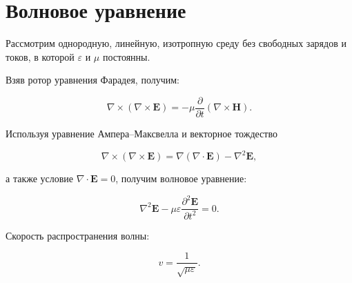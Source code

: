 \section{Волновое уравнение}
\label{sec:wave}

Рассмотрим однородную, линейную,
изотропную среду без свободных зарядов
и токов, в которой $\varepsilon$
и $\mu$ постоянны.

Взяв ротор уравнения Фарадея,
получим:

\begin{equation}
\nabla \times (\nabla \times \mathbf{E})
=
-\mu \frac{\partial}{\partial t}
(\nabla \times \mathbf{H}).
\end{equation}

Используя уравнение Ампера--Максвелла
и векторное тождество

\begin{equation}
\nabla \times (\nabla \times \mathbf{E})
=
\nabla(\nabla \cdot \mathbf{E})
-
\nabla^2 \mathbf{E},
\end{equation}

а также условие
$\nabla \cdot \mathbf{E}=0$,
получим волновое уравнение:

\begin{equation}
\boxed{
\nabla^2 \mathbf{E}
-
\mu\varepsilon
\frac{\partial^2 \mathbf{E}}{\partial t^2}
=0
}.
\end{equation}

Скорость распространения волны:

\begin{equation}
v=\frac{1}{\sqrt{\mu\varepsilon}}.
\end{equation}
